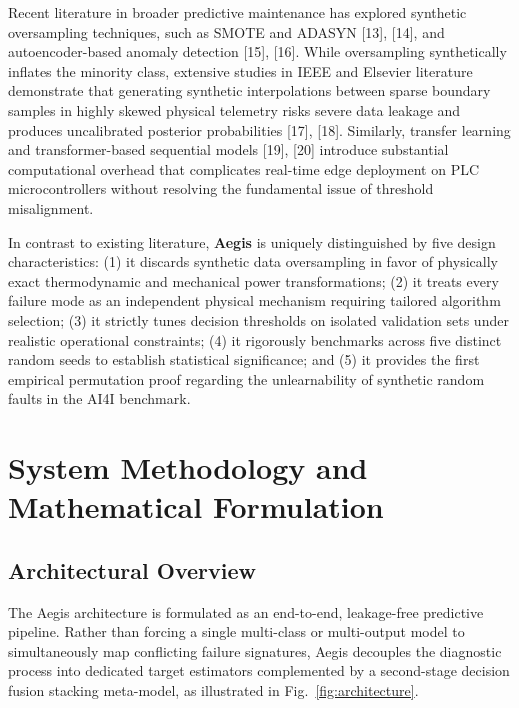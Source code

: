 \documentclass[conference]{IEEEtran}
\begin{document}
Recent literature in broader predictive maintenance has explored synthetic oversampling techniques, such as SMOTE and ADASYN [13], [14], and autoencoder-based anomaly detection [15], [16]. While oversampling synthetically inflates the minority class, extensive studies in IEEE and Elsevier literature demonstrate that generating synthetic interpolations between sparse boundary samples in highly skewed physical telemetry risks severe data leakage and produces uncalibrated posterior probabilities [17], [18]. Similarly, transfer learning and transformer-based sequential models [19], [20] introduce substantial computational overhead that complicates real-time edge deployment on PLC microcontrollers without resolving the fundamental issue of threshold misalignment.

In contrast to existing literature, \textbf{Aegis} is uniquely distinguished by five design characteristics: (1) it discards synthetic data oversampling in favor of physically exact thermodynamic and mechanical power transformations; (2) it treats every failure mode as an independent physical mechanism requiring tailored algorithm selection; (3) it strictly tunes decision thresholds on isolated validation sets under realistic operational constraints; (4) it rigorously benchmarks across five distinct random seeds to establish statistical significance; and (5) it provides the first empirical permutation proof regarding the unlearnability of synthetic random faults in the AI4I benchmark.

\section{System Methodology and Mathematical Formulation}

\subsection{Architectural Overview}
The Aegis architecture is formulated as an end-to-end, leakage-free predictive pipeline. Rather than forcing a single multi-class or multi-output model to simultaneously map conflicting failure signatures, Aegis decouples the diagnostic process into dedicated target estimators complemented by a second-stage decision fusion stacking meta-model, as illustrated in Fig.~\ref{fig:architecture}.
\end{document}
